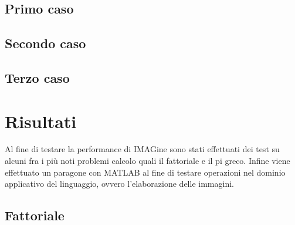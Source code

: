 \documentclass[10pt]{article}
\begin{document}
\subsection{Primo caso}

\clearpage


\subsection{Secondo caso}

\clearpage


\subsection{Terzo caso}


\clearpage
\section{Risultati}
Al fine di testare la performance di IMAGine sono stati effettuati dei test su alcuni fra i più noti problemi calcolo quali il fattoriale e il pi greco. Infine viene effettuato un paragone con MATLAB al fine di testare operazioni nel dominio applicativo del linguaggio, ovvero l'elaborazione delle immagini.

\subsection{Fattoriale}




\end{document}
